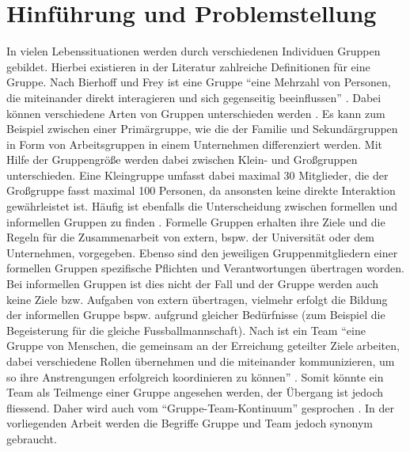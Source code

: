 \chapter{Hinführung und Problemstellung}
\label{kap1_hinfuehrung_problemstellung}

In vielen Lebenssituationen werden durch verschiedenen Individuen Gruppen gebildet. Hierbei existieren in der Literatur zahlreiche Definitionen für eine Gruppe. Nach Bierhoff und Frey ist eine Gruppe “eine Mehrzahl von Personen, die miteinander direkt interagieren und sich gegenseitig beeinflussen”  \citep[S.~638]{bierhoff_handbuch_2006}.
\newline\newline
Dabei können verschiedene Arten von Gruppen unterschieden werden \citep[Vgl. zum folgenden Abschnitt][S.~11ff.]{thomas_grundris_1991}. Es kann zum Beispiel zwischen einer Primärgruppe, wie die der Familie und Sekundärgruppen in Form von Arbeitsgruppen in einem Unternehmen differenziert werden. Mit Hilfe der Gruppengröße werden dabei zwischen Klein- und Großgruppen unterschieden. Eine Kleingruppe umfasst dabei maximal 30 Mitglieder, die der Großgruppe fasst maximal 100 Personen, da ansonsten keine direkte Interaktion gewährleistet ist.
\newline\newline 
Häufig ist ebenfalls die Unterscheidung zwischen formellen und informellen Gruppen zu finden \citep[Vgl. zum folgenden Abschnitt][S.~48]{spies_organisationspsychologie_2010}.
Formelle Gruppen erhalten ihre Ziele und die Regeln für die Zusammenarbeit von extern, bspw. der Universität oder dem Unternehmen, vorgegeben. Ebenso sind den jeweiligen Gruppenmitgliedern einer formellen Gruppen spezifische Pflichten und Verantwortungen übertragen worden. Bei informellen Gruppen ist dies nicht der Fall und der Gruppe werden auch keine Ziele bzw. Aufgaben von extern übertragen, vielmehr erfolgt die Bildung der informellen Gruppe bspw. aufgrund gleicher Bedürfnisse (zum Beispiel die Begeisterung für die gleiche Fussballmannschaft). 
\newline\newline
Nach \citet{dick_teamwork_2013} ist ein Team "`eine Gruppe von Menschen, die gemeinsam an der Erreichung geteilter Ziele arbeiten, dabei verschiedene Rollen übernehmen und die miteinander kommunizieren, um so ihre Anstrengungen erfolgreich koordinieren zu können"' \citep[S.~1]{dick_teamwork_2013}. Somit könnte ein Team als Teilmenge einer Gruppe angesehen werden, der Übergang ist jedoch fliessend. Daher wird auch vom "`Gruppe-Team-Kontinuum"' gesprochen \citep[Vgl.][S.~14]{brettel_erfolgreiche_2009}. In der vorliegenden Arbeit werden die Begriffe Gruppe und Team jedoch synonym gebraucht.
